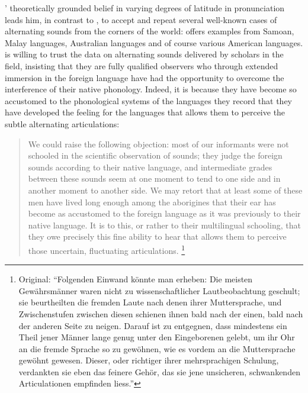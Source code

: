 \documentclass[output=paper]{langscibook}
\begin{document}
{\Gabelentz}' theoretically grounded belief in varying degrees of latitude in pronunciation leads him, in contrast to {\Boas}, to accept and repeat several well-known cases of alternating sounds from the corners of the world: \citet[202--204]{Gabelentz20161891} offers examples from Samoan, Malay languages, Australian languages and of course various American languages. {\Gabelentz} is willing to trust the data on alternating sounds delivered by scholars in the field, insisting that they are fully qualified observers who through extended immersion in the foreign language have had the opportunity to overcome the interference of their native phonology. Indeed, it is because they have become so accustomed to the phonological systems of the languages they record that they have developed the feeling for the languages that allows them to perceive the subtle alternating articulations:

\begin{quotation}
We could raise the following objection: most of our informants were not schooled in the scientific observation of sounds; they judge the foreign sounds according to their native language, and intermediate grades between these sounds seem at one moment to tend to one side and in another moment to another side. We may retort that at least some of these men have lived long enough among the aborigines that their ear has become as accustomed to the foreign language as it was previously to their native language. It is to this, or rather to their multilingual schooling, that they owe precisely this fine ability to hear that allows them to perceive those uncertain, fluctuating articulations. \citep[204--205]{Gabelentz20161891}\footnote{Original: ``Folgenden Einwand könnte man erheben: Die meisten Gewährsmänner waren nicht zu wissenschaftlicher Lautbeobachtung geschult; sie beurtheilten die fremden Laute nach denen ihrer Muttersprache, und Zwischenstufen zwischen diesen schienen ihnen bald nach der einen, bald nach der anderen Seite zu neigen. Darauf ist zu entgegnen, dass mindestens ein Theil jener Männer lange genug unter den Eingeborenen gelebt, um ihr Ohr an die fremde Sprache so zu gewöhnen, wie es vordem an die Muttersprache gewöhnt gewesen. Dieser, oder richtiger ihrer mehrsprachigen Schulung, verdankten sie eben das feinere Gehör, das sie jene unsicheren, schwankenden Articulationen empfinden liess.''}
\end{quotation}
\end{document}
